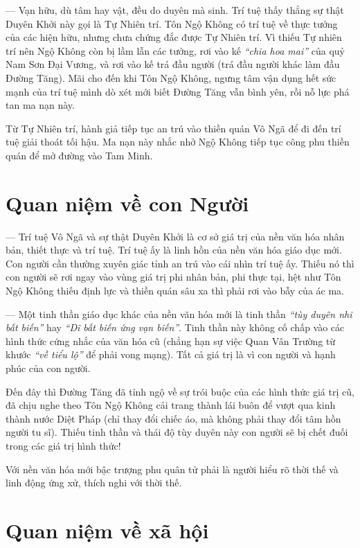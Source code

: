 --- Vạn hữu, dù tâm hay vật, đều do duyên mà sinh. Trí tuệ thấy thẳng sự thật Duyên Khởi này gọi là Tự Nhiên trí. Tôn Ngộ Không có trí tuệ về thực tướng của các hiện hữu, nhưng chưa chứng đắc được Tự Nhiên trí. Vì thiếu Tự nhiên trí nên Ngộ Không còn bị lầm lẫn các tưởng, rơi vào kế \emph{``chia hoa mai''} của quỷ Nam Sơn Đại Vương, và rơi vào kế trá đầu người (trá đầu người khác làm đầu Đường Tăng). Mãi cho đến khi Tôn Ngộ Không, ngưng tâm vận dụng hết sức mạnh của trí tuệ mình dò xét mới biết Đường Tăng vẫn bình yên, rồi nỗ lực phá tan ma nạn này.

Từ Tự Nhiên trí, hành giả tiếp tục an trú vào thiền quán Vô Ngã để đi đến trí tuệ giải thoát tối hậu. Ma nạn này nhắc nhở Ngộ Không tiếp tục công phu thiền quán để mở đường vào Tam Minh.

\section{Quan niệm về con Người} %
\label{sec:84_85_con_nguoi}

--- Trí tuệ Vô Ngã và sự thật Duyên Khởi là cơ sở giá trị của nền văn hóa nhân bản, thiết thực và trí tuệ. Trí tuệ ấy là linh hồn của nền văn hóa giáo dục mới. Con người cần thường xuyên giác tỉnh an trú vào cái nhìn trí tuệ ấy. Thiếu nó thì con người sẽ rơi ngay vào vùng giá trị phi nhân bản, phi thực tại, hệt như Tôn Ngộ Không thiếu định lực và thiền quán sâu xa thì phải rơi vào bẫy của ác ma.

--- Một tinh thần giáo dục khác của nền văn hóa mới là tinh thần \emph{``tùy duyên nhi bất biến''} hay \emph{``Dĩ bất biến ứng vạn biến''}. Tinh thần này không cố chấp vào các hình thức cứng nhắc của văn hóa cũ (chẳng hạn sự việc Quan Vân Trường từ khước \emph{``về tiểu lộ''} để phải vong mạng). Tất cả giá trị là vì con người và hạnh phúc của con người.

Đến đây thì Đường Tăng đã tỉnh ngộ về sự trói buộc của các hình thức giá trị cũ, đã chịu nghe theo Tôn Ngộ Không cải trang thành lái buôn để vượt qua kinh thành nước Diệt Pháp (chỉ thay đổi chiếc áo, mà không phải thay đổi tâm hồn người tu sĩ). Thiếu tinh thần và thái độ tùy duyên này con người sẽ bị chết đuối trong các giá trị hình thức!

Với nền văn hóa mới bậc trượng phu quân tử phải là người hiểu rõ thời thế và linh động ứng xử, thích nghi với thời thế.

\section{Quan niệm về xã hội} %
\label{sec:84_85_xa_hoi}

